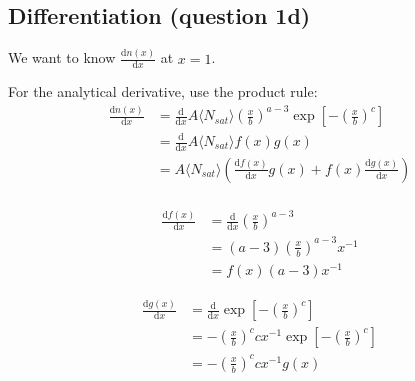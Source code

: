 




\subsection{Differentiation (question 1d)}

We want to know $\frac{\mathrm{d}n(x)}{\mathrm{d}x}$ at $x=1$. 

For the analytical derivative, use the product rule:
\begin{equation}
\begin{split}
\frac{\mathrm{d}n(x)}{\mathrm{d}x} & = \frac{\mathrm{d}}{\mathrm{d}x} A \langle N_{sat} \rangle \left( \frac{x}{b} \right)^{a-3}
\exp{\left[ -\left(\frac{x}{b}\right)^c \right]} \\
& = \frac{\mathrm{d}}{\mathrm{d}x} A \langle N_{sat} \rangle 
f(x) g(x) \\
& = A \langle N_{sat} \rangle 
\left( \frac{\mathrm{d}f(x)}{\mathrm{d}x} g(x) + f(x) \frac{\mathrm{d}g(x)}{\mathrm{d}x} \right)
 \\
\end{split}
\end{equation}

\begin{equation}
\begin{split}
\frac{\mathrm{d}f(x)}{\mathrm{d}x} & = \frac{\mathrm{d}}{\mathrm{d}x}  \left( \frac{x}{b} \right)^{a-3} \\
& = (a-3) \left( \frac{x}{b} \right)^{a-3} x^{-1} \\
& = f(x) (a-3) x^{-1}
\end{split}
\end{equation}

\begin{equation}
\begin{split}
\frac{\mathrm{d}g(x)}{\mathrm{d}x} & = \frac{\mathrm{d}}{\mathrm{d}x} 
\exp{\left[ -\left(\frac{x}{b}\right)^c \right]} \\
& = - \left(\frac{x}{b}\right)^c  c x^{-1}
 \exp{\left[ -\left(\frac{x}{b}\right)^c \right]}
 \\
& = - \left(\frac{x}{b}\right)^c  c x^{-1} g(x) \\
\end{split}
\end{equation}

